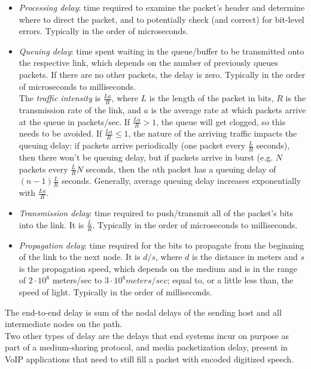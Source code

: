 \documentclass[table, xcdraw]{article}%
\begin{document}
\begin{itemize}
    \item \emph{Processing delay}: time required to examine the packet’s header and determine where to direct the packet, and to potentially check (and correct) for bit-level errors. Typically in the order of microseconds.
    \item \emph{Queuing delay}: time spent waiting in the queue/buffer to be transmitted onto the respective link, which depends on the number of previously queues packets. If there are no other packets, the delay is zero. Typically in the order of microseconds to milliseconds.\\
    The \emph{traffic intensity} is $\frac{La}{R}$, where $L$ is the length of the packet in bits, $R$ is the transmission rate of the link, and $a$ is the average rate at which packets arrive at the queue in packets/sec. If $\frac{La}{R} > 1$, the queue will get clogged, so this needs to be avoided. If $\frac{La}{R} \leq 1$, the nature of the arriving traffic impacts the queuing delay: if packets arrive periodically (one packet every $\frac{L}{R}$ seconds), then there won't be queuing delay, but if packets arrive in burst (e.g. $N$ packets every $\frac{L}{R}N$ seconds, then the $n$th packet has a queuing delay of $(n - 1)\frac{L}{R}$ seconds. Generally, average queuing delay increases exponentially with $\frac{La}{R}$.
    \item \emph{Transmission delay}: time required to push/transmit all of the packet’s bits into the link. It is $\frac{L}{R}$. Typically in the order of microseconds to milliseconds.
    \item \emph{Propagation delay}: time required for the bits to propagate from the beginning of the link to the next node. It is $d/s$, where $d$ is the distance in meters and $s$ is the propagation speed, which depends on the medium and is in the range of $2 \cdot 10^8$ meters/sec to $3 \cdot 10^8 meters/sec$; equal to, or a little less than, the speed of light. Typically in the order of milliseconds.
\end{itemize}

The end-to-end delay is sum of the nodal delays of the sending host and all intermediate nodes on the path.\\
Two other types of delay are the delays that end systems incur on purpose as part of a medium-sharing protocol, and media packetization delay, present in VoIP applications that need to still fill a packet with encoded digitized speech.
\end{document}
